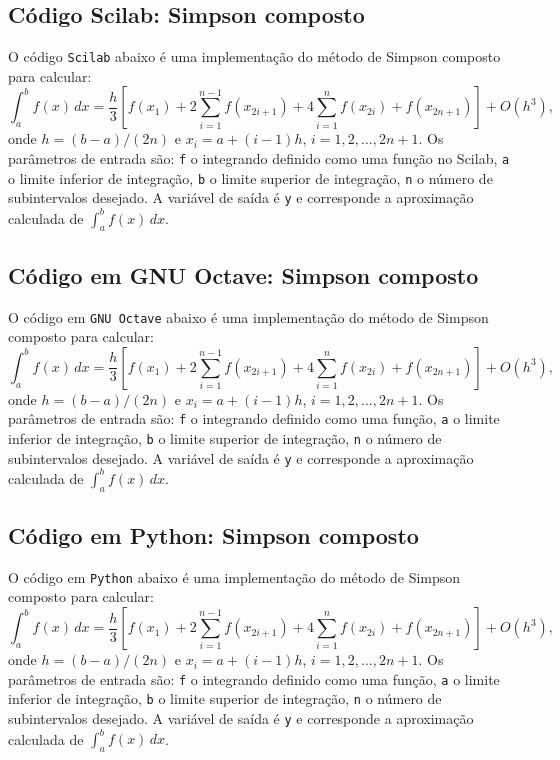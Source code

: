 \ifisscilab
\subsection{Código Scilab: Simpson composto}
O código \verb+Scilab+ abaixo é uma implementação do método de Simpson composto para calcular:
\begin{equation}
  \int_a^b f(x)\,dx = \frac{h}{3}\left[f(x_1) + 2\sum_{i=1}^{n-1} f(x_{2i+1}) + 4\sum_{i=1}^{n} f(x_{2i}) + f(x_{2n+1})\right] + O(h^3),
\end{equation}
onde $h = (b-a)/(2n)$ e $x_i = a + (i-1)h$, $i=1,2,\dotsc,2n+1$. Os parâmetros de entrada são: \verb+f+ o integrando definido como uma função no Scilab, \verb+a+ o limite inferior de integração, \verb+b+ o limite superior de integração, \verb+n+ o número de subintervalos desejado. A variável de saída é \verb+y+ e corresponde a aproximação calculada de $\int_a^b f(x)\, dx$.

\fi
\ifisoctave
\subsection{Código em GNU Octave: Simpson composto}
O código em \verb+GNU Octave+ abaixo é uma implementação do método de Simpson composto para calcular:
\begin{equation}
  \int_a^b f(x)\,dx = \frac{h}{3}\left[f(x_1) + 2\sum_{i=1}^{n-1} f(x_{2i+1}) + 4\sum_{i=1}^{n} f(x_{2i}) + f(x_{2n+1})\right] + O(h^3),
\end{equation}
onde $h = (b-a)/(2n)$ e $x_i = a + (i-1)h$, $i=1,2,\dotsc,2n+1$. Os parâmetros de entrada são: \verb+f+ o integrando definido como uma função, \verb+a+ o limite inferior de integração, \verb+b+ o limite superior de integração, \verb+n+ o número de subintervalos desejado. A variável de saída é \verb+y+ e corresponde a aproximação calculada de $\int_a^b f(x)\, dx$.

\fi
\ifispython
\subsection{Código em Python: Simpson composto}
O código em \verb+Python+ abaixo é uma implementação do método de Simpson composto para calcular:
\begin{equation}
  \int_a^b f(x)\,dx = \frac{h}{3}\left[f(x_1) + 2\sum_{i=1}^{n-1} f(x_{2i+1}) + 4\sum_{i=1}^{n} f(x_{2i}) + f(x_{2n+1})\right] + O(h^3),
\end{equation}
onde $h = (b-a)/(2n)$ e $x_i = a + (i-1)h$, $i=1,2,\dotsc,2n+1$. Os parâmetros de entrada são: \verb+f+ o integrando definido como uma função, \verb+a+ o limite inferior de integração, \verb+b+ o limite superior de integração, \verb+n+ o número de subintervalos desejado. A variável de saída é \verb+y+ e corresponde a aproximação calculada de $\int_a^b f(x)\, dx$.

